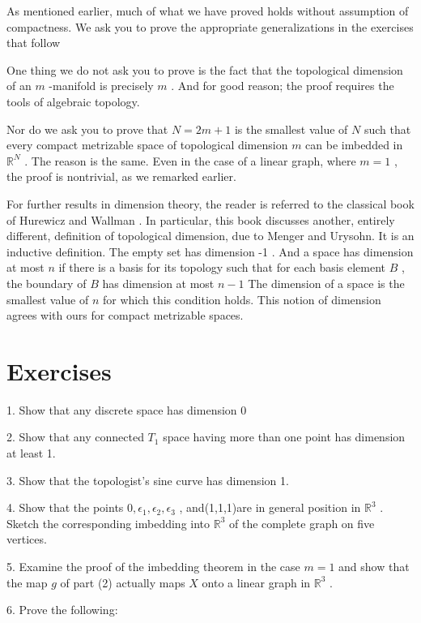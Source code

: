 As mentioned earlier, much of what we have proved holds without assumption of compactness. We ask you to prove the appropriate generalizations in the exercises that follow

One thing we do not ask you to prove is the fact that the topological dimension of an \(m\) -manifold is precisely \(m\) . And for good reason; the proof requires the tools of algebraic topology.

Nor do we ask you to prove that \(N = {2m} + 1\) is the smallest value of \(N\) such that every compact metrizable space of topological dimension \(m\) can be imbedded in \({\mathbb{R}}^{N}\) . The reason is the same. Even in the case of a linear graph, where \(m = 1\) , the proof is nontrivial, as we remarked earlier.

For further results in dimension theory, the reader is referred to the classical book of Hurewicz and Wallman 		\cite{HurewiczWallman1974}. In particular, this book discusses another, entirely different, definition of topological dimension, due to Menger and Urysohn. It is an inductive definition. The empty set has dimension -1 . And a space has dimension at most \(n\) if there is a basis for its topology such that for each basis element \(B\) , the boundary of \(B\) has dimension at most \(n - 1\) The dimension of a space is the smallest value of \(n\) for which this condition holds. This notion of dimension agrees with ours for compact metrizable spaces.

\section*{Exercises}

1. Show that any discrete space has dimension 0

2. Show that any connected \({T}_{1}\) space having more than one point has dimension at least 1.

3. Show that the topologist's sine curve has dimension 1.

4. Show that the points \(0,{\epsilon }_{1},{\epsilon }_{2},{\epsilon }_{3}\) , and(1,1,1)are in general position in \({\mathbb{R}}^{3}\) . Sketch the corresponding imbedding into \({\mathbb{R}}^{3}\) of the complete graph on five vertices.

5. Examine the proof of the imbedding theorem in the case \(m = 1\) and show that the map \(g\) of part (2) actually maps \(X\) onto a linear graph in \({\mathbb{R}}^{3}\) .

6. Prove the following:

